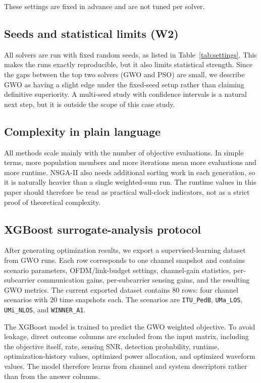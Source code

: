 \documentclass[runningheads]{llncs}
\begin{document}
These settings are fixed in advance and are not tuned per solver.

\subsection{Seeds and statistical limits (W2)}
All solvers are run with fixed random seeds, as listed in Table~\ref{tab:settings}. This makes the runs exactly reproducible, but it also limits statistical strength. Since the gaps between the top two solvers (GWO and PSO) are small, we describe GWO as having a slight edge under the fixed-seed setup rather than claiming definitive superiority. A multi-seed study with confidence intervals is a natural next step, but it is outside the scope of this case study.

\subsection{Complexity in plain language}
All methods scale mainly with the number of objective evaluations. In simple terms, more population members and more iterations mean more evaluations and more runtime. NSGA-II also needs additional sorting work in each generation, so it is naturally heavier than a single weighted-sum run. The runtime values in this paper should therefore be read as practical wall-clock indicators, not as a strict proof of theoretical complexity.

\subsection{XGBoost surrogate-analysis protocol}
After generating optimization results, we export a supervised-learning dataset from GWO runs. Each row corresponds to one channel snapshot and contains scenario parameters, OFDM/link-budget settings, channel-gain statistics, per-subcarrier communication gains, per-subcarrier sensing gains, and the resulting GWO metrics. The current exported dataset contains 80 rows: four channel scenarios with 20 time snapshots each. The scenarios are \texttt{ITU\_PedB}, \texttt{UMa\_LOS}, \texttt{UMi\_NLOS}, and \texttt{WINNER\_A1}.

The XGBoost model is trained to predict the GWO weighted objective. To avoid leakage, direct outcome columns are excluded from the input matrix, including the objective itself, rate, sensing SNR, detection probability, runtime, optimization-history values, optimized power allocation, and optimized waveform values. The model therefore learns from channel and system descriptors rather than from the answer columns.
\end{document}
